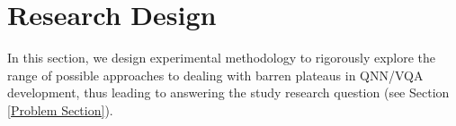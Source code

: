\section{Research Design} \label{Research Design section} 
In this section, we design experimental methodology to rigorously explore the range of possible approaches to dealing with barren plateaus in QNN/VQA development, thus leading to answering the study research question (see Section \ref{Problem Section}).

% 

%  













% 